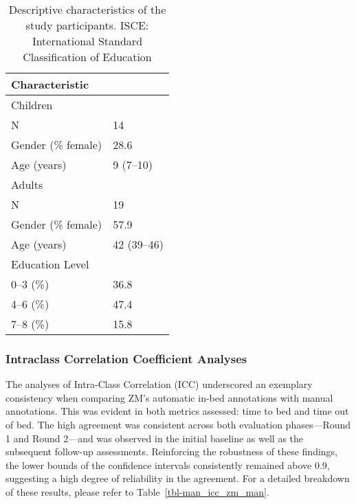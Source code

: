 \documentclass[
  9pt,
]{article}
\begin{document}
\hypertarget{tbl-man_describe}{}
\begin{longtable}{ll}
\caption{\label{tbl-man_describe}Descriptive characteristics of the study participants. ISCE:
International Standard Classification of Education }\tabularnewline

\toprule
Characteristic &  \\ 
\midrule
\multicolumn{2}{l}{Children} \\ 
\midrule
N & 14 \\ 
Gender (\% female) & 28.6 \\ 
Age (years) & 9 (7–10) \\ 
\midrule
\multicolumn{2}{l}{Adults} \\ 
\midrule
N & 19 \\ 
Gender (\% female) & 57.9 \\ 
Age (years) & 42 (39–46) \\ 
Education Level &  \\ 
0–3 (\%) & 36.8 \\ 
4–6 (\%) & 47.4 \\ 
7–8 (\%) & 15.8 \\ 
\bottomrule
\end{longtable}

\endgroup

\hypertarget{intraclass-correlation-coefficient-analyses}{%
\subsubsection{Intraclass Correlation Coefficient
Analyses}\label{intraclass-correlation-coefficient-analyses}}

The analyses of Intra-Class Correlation (ICC) underscored an exemplary
consistency when comparing ZM's automatic in-bed annotations with manual
annotations. This was evident in both metrics assessed: time to bed and
time out of bed. The high agreement was consistent across both
evaluation phases---Round 1 and Round 2---and was observed in the
initial baseline as well as the subsequent follow-up assessments.
Reinforcing the robustness of these findings, the lower bounds of the
confidence intervals consistently remained above 0.9, suggesting a high
degree of reliability in the agreement. For a detailed breakdown of
these results, please refer to Table~\ref{tbl-man_icc_zm_man}.

\newpage

\begingroup

\footnotesize
\end{document}
